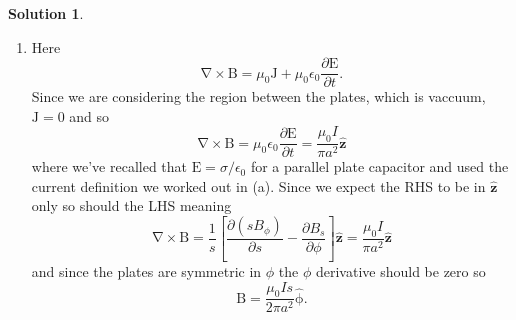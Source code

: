 \documentclass[10pt]{article}
\theoremstyle{definition}
\newtheorem{soln}{Solution}
\newcommand{\uy}{\hat{\mathbf{y}}}
\newcommand{\uz}{\hat{\mathbf{z}}}
\newcommand{\uv}[1]{\hat{\bv{{#1}}}}
\renewcommand{\curl}[1]{\bv{\nabla}\times #1}
\newcommand{\bv}[1]{\bm{\mathrm{#1}}}
\begin{document}
\begin{soln}
\begin{enumerate}[label=(\alph*)]
$$            -\left[K\left(z\mp w/2\right)\cos\phi'\right]\uy
            \left[-Ks'\sin\phi'\cos\phi'+Ks'\cos\phi'\sin\phi'\right]\uz.
          $$
          Obviously the $\uz$ term is zero. When we integrate the other two over the entire disc(s) the $\sin\phi'$ and
          $\cos\phi'$ will go to zero. This means, on axis, $\bv{B}(\bv{r})=\bv{0}$.
    \item Here
          $$\curl{\bv{B}}=\mu_0\bv{J}+\mu_0\epsilon_0\frac{\partial \bv{E}}{\partial t}.$$
          Since we are considering the region between the plates, which is vaccuum, $\bv{J}=0$ and so
          $$\curl{\bv{B}}=\mu_0\epsilon_0\frac{\partial \bv{E}}{\partial t}=\frac{\mu_0 I}{\pi a^2}\uz$$
          where we've recalled that $\bv{E}=\sigma/\epsilon_0$ for a parallel plate capacitor and used the current definition we worked out in (a).
          Since we expect the RHS to be in $\uz$ only so should the LHS meaning
          $$\curl{\bv{B}}=\frac{1}{s}\left[\frac{\partial (s B_\phi)}{\partial s}-\frac{\partial B_s}{\partial \phi}\right]\uz=\frac{\mu_0 I}{\pi a^2}\uz$$
          and since the plates are symmetric in $\phi$ the $\phi$ derivative should be zero so
          $$\bv{B}=\frac{\mu_0 Is}{2\pi a^2}\uv{\phi}.$$
  \end{enumerate}
\end{soln}
\end{document}

